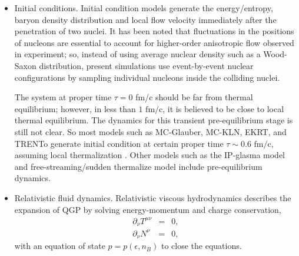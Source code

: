 \documentclass[aps,prl,twocolumn,groupedaddress]{revtex4-1}
\begin{document}
	\begin{itemize}
		\item Initial conditions. 		
		Initial condition models generate the energy/entropy, baryon density distribution and local flow velocity immediately after the penetration of two nuclei.
		It has been noted that fluctuations in the positions of nucleons are essential to account for higher-order anisotropic flow observed in experiment;
		so, instead of using average nuclear density such as a Wood-Saxon distribution, present simulations use event-by-event nuclear configurations by sampling individual nucleons inside the colliding nuclei.
		
		The system at proper time $\tau = 0$ fm/c should be far from thermal equilibrium; however, in less than $1 \textrm{ fm/c}$, it is believed to be close to local thermal equilibrium.
		The dynamics for this transient pre-equilibrium stage is still not clear.
		So most models such as MC-Glauber, MC-KLN, EKRT, and TRENTo generate initial condition at certain proper time $\tau\sim 0.6 \textrm{ fm/c}$, assuming local thermalization \citep{Miller:2007ri, Drescher:2006ca, Eskola:1999fc, Moreland:2014oya}.
		Other models such as the IP-glasma model \citep{Schenke:2012wb} and free-streaming/sudden thermalize model \citep{Liu:2015nwa} include pre-equilibrium dynamics.
		
		\item Relativistic fluid dynamics. 
		Relativistic viscous hydrodynamics describes the expansion of QGP by solving energy-momentum and charge conservation,
		\begin{eqnarray}
			\partial_\nu T^{\mu\nu} &=& 0, \\
			\partial_\nu N^{\nu} &=& 0,
		\end{eqnarray}
		with an equation of state $p = p(\epsilon, n_B)$ to close the equations. 
		

\end{itemize}
\end{document}
